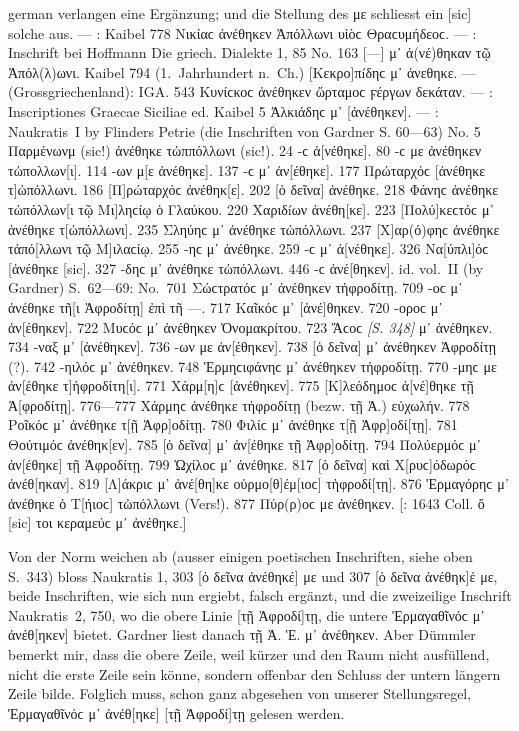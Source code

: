 \begin{otherlanguage*}{german}
verlangen eine Ergänzung; und die Stellung des με schliesst ein [sic] solche aus. —  : Kaibel 778 Νικίαϲ  ἀνέθηκεν Ἀπόλλωνι υἱὸϲ Θραϲυμήδεοϲ. — : Inschrift bei Hoffmann Die griech. Dialekte 1, 85 No. 163 [—] μ᾽ ἀ(νέ)θηκαν τῷ Ἀπόλ(λ)ωνι. Kaibel 794 (1.~Jahrhundert n.~Ch.) [Κεκρο]πíδηϲ μ᾽ ἀνεθηκε. —  (Grossgriechenland): IGA. 543 Κυνίϲκοϲ  ἀνέθηκεν ὥρταμοϲ ϝέργων δεκάταν. — : Inscriptiones Graecae Siciliae ed. Kaibel 5 Ἀλκιάδηϲ μ᾽ [ἀνέθηκεν]. — : Naukratis~I by Flinders Petrie (die Inschriften von Gardner S. 60—63) No. 5 Παρμένωνμ (sic!)  ἀνέθηκε τὠππόλλωνι (sic!). 24 -ϲ  ἀ[νέθηκε]. 80 -ϲ με ἀνέθηκεν τὠπολλων[ι]. 114 -ων μ[ε ἀνέθηκε]. 137 -ϲ μ᾽ ἀν[έθηκε]. 177 Πρώταρχόϲ  [ἀνέθηκε τ]ὠπόλλωνι. 186 [Π]ρώταρχόϲ  ἀνέθηκ[ε]. 202 [ὁ δεῖνα]  ἀνέθηκε. 218 Φάνηϲ  ἀνέθηκε τὠπόλλων[ι τῷ Μι]ληϲίῳ ὁ Γλαύκου. 220 Χαριδíων  ἀνέθη[κε]. 223 [Πολύ]κεϲτόϲ μ᾽ ἀνέθηκε τ[ὠπόλλωνι]. 235 Σλη\-ύηϲ μ᾽ ἀνέθηκε τὠπόλλωνι. 237 [Χ]αρ(ό)φηϲ  ἀνέθηκε τἀπό[λλωνι τῷ Μ]ι\-λα\-ϲίῳ. 255 -ηϲ μ᾽ ἀνέθηκε. 259 -ϲ μ᾽ ἀ[νέθηκε]. 326 Να[ύπλι]όϲ  [ἀνέθηκε [sic]. 327 -δηϲ μ᾽ ἀνέθηκε τὠπόλλωνι. 446 -ϲ  ἀνέ[θηκεν]. id. vol.~II (by Gardner) S.~62—69: No.~701 Σώϲτρατόϲ μ᾽ ἀνέθηκεν τἠφροδίτῃ. 709 -οϲ μ᾽ ἀνέθηκε τῆ[ι Ἀφροδίτῃ] ἐπὶ τῆ —. 717 Καῖκόϲ μ᾽ [ἀνέ]θηκεν. 720 -οροϲ μ᾽ ἀν[έθηκεν]. 722 Μυϲόϲ μ᾽ ἀνέθηκεν Ὀνομακρίτου. 723 Ἄϲοϲ \hypertarget{p348}{\emph{[S. 348]}}\label{p348} μ᾽ ἀνέθηκεν. 734 -ναξ μ᾽ [ἀνέθηκεν]. 736 -ων με ἀν[έθηκεν]. 738 [ὁ δεῖνα] μ᾽ ἀνέθηκεν Ἀφροδίτῃ (?). 742 -ηιλόϲ μ᾽ ἀνέθηκεν. 748 Ἑρμηϲιφάνηϲ μ᾽ ἀνέθηκεν τἠφροδίτῃ. 770 -μηϲ με ἀν[έθηκε τ]ἠφροδίτη[ι]. 771 Χάρμ[η]ϲ  [ἀνέθηκεν]. 775 [Κ]λεόδημοϲ  ἀ[νέ]θηκε τῇ Ἀ[φροδίτῃ]. 776—777 Χάρμηϲ  ἀνέθηκε τἠφροδίτῃ (bezw. τῇ Ἀ.) εὐχωλήν. 778 Ροῖκόϲ μ᾽ ἀνέθηκε τ[ῇ Ἀφρ]οδίτῃ. 780 Φιλίϲ μ᾽ ἀνέθηκε τ[ῇ Ἀφρ]οδί[τῃ]. 781 Θούτιμόϲ  ἀνέθηκ[εν]. 785 [ὁ δεῖνα] μ᾽ ἀν[έθηκε τῇ Ἀφρ]οδίτῃ. 794 Πολύερμόϲ μ᾽ ἀν[έθηκε] τῇ Ἀφροδίτῃ. 799 Ὠχίλοϲ μ᾽ ἀνέθηκε. 817 [ὁ δεῖνα] καὶ Χ[ρυϲ]όδωρόϲ  ἀνέθ[ηκαν]. 819 [Λ]ά\-κρι\-[τό]ϲ μ᾽ ἀνέ[θη]κε οὑρμο[θ]έμ[ιοϲ] τἠφροδί[τῃ]. 876 Ἑρμαγόρηϲ μ᾽ ἀνέ\-θηκε ὁ Τ[ήιοϲ] τὠπόλλωνι (Vers!). 877 Πύρ(ρ)οϲ με ἀνέθηκεν. [: 1643 Coll. ὄ [sic] τοι κεραμεύϲ μ᾽ ἀνέθηκε.]

Von der Norm weichen ab (ausser einigen poetischen Inschriften, siehe oben S.~343) bloss Naukratis 1, 303 [ὁ δεῖνα ἀνέθηκέ] με und 307 [ὁ δεῖνα ἀνέθηκ]έ με, beide Inschriften, wie sich nun ergiebt, falsch ergänzt, und die zweizeilige Inschrift Naukratis~2, 750, wo die obere Linie [τῇ Ἀφροδί]τῃ, die untere Ἑρμαγα\-θῖνόϲ μ᾽ ἀνέθ[ηκεν] bietet. Gardner liest danach τῇ Ἀ. Ἑ. μ᾽ ἀνέθηκεν. Aber Dümmler bemerkt mir, dass die obere Zeile, weil kürzer und den Raum nicht ausfüllend, nicht die erste Zeile sein könne, sondern offenbar den Schluss der untern längern Zeile bilde. Folglich muss, schon ganz abgesehen von unserer Stellungsregel, Ἑρμαγαθῖνόϲ μ᾽ ἀνέθ[ηκε] [τῇ Ἀφροδί]τῃ gelesen werden.


\end{otherlanguage*}
